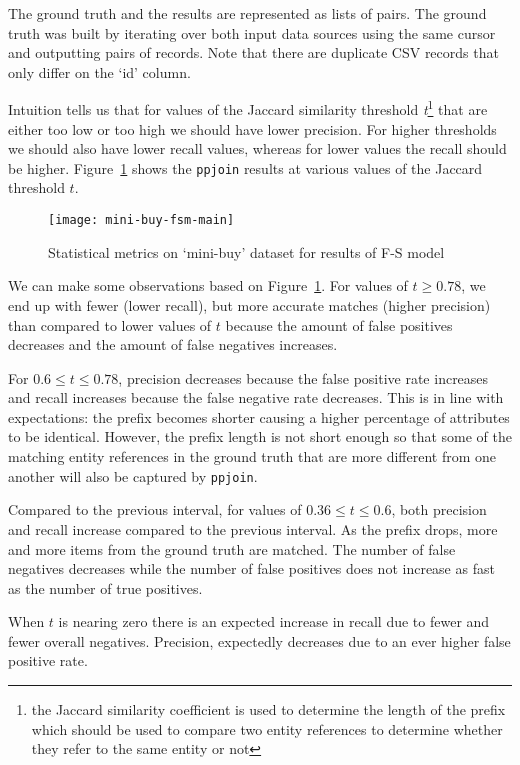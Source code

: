 The ground truth and the results are represented as lists of pairs.
The ground truth was built by iterating over both input data sources using
the same cursor and outputting pairs of records.
Note that there are duplicate CSV records that only differ on the `id' column.

Intuition tells us that for values of the Jaccard similarity threshold
\textit{t}\footnote[1]{the Jaccard similarity coefficient is used to determine
the length of the prefix which should be used to compare two entity references
to determine whether they refer to the same entity or not} that are either too
low or too high we should have lower precision.
For higher thresholds we should also have lower recall values, whereas for
lower values the recall should be higher.
Figure~\ref{fig:mini-buy-fs} shows the \texttt{ppjoin} results at various
values of the Jaccard threshold $t$.

\begin{figure}[htbp]
    \centering
    \captionsetup{justification=centering}
    \texttt{[image: mini-buy-fsm-main]}
    \caption{Statistical metrics on `mini-buy' dataset for results of F-S model}
    \label{fig:mini-buy-fs}
\end{figure}

We can make some observations based on Figure~\ref{fig:mini-buy-fs}.
For values of $t \geq 0.78$, we end up with fewer (lower recall), but more
accurate matches (higher precision) than compared to lower values of $t$ because
the amount of false positives decreases and the amount of false negatives
increases.

For $0.6 \leq t \le 0.78$, precision decreases because the false
positive rate increases and recall increases because the false negative rate
decreases.
This is in line with expectations: the prefix becomes shorter causing a higher
percentage of attributes to be identical.
However, the prefix length is not short enough so that some of the matching
entity references in the ground truth that are more different from one another
will also be captured by \texttt{ppjoin}.

Compared to the previous interval, for values of $0.36 \leq t \le 0.6$, both
precision and recall increase compared to the previous interval.
As the prefix drops, more and more items from the ground truth are matched.
The number of false negatives decreases while the number of false positives
does not increase as fast as the number of true positives.

When $t$ is nearing zero there is an expected increase in recall due to fewer
and fewer overall negatives.
Precision, expectedly decreases due to an ever higher false positive rate.

